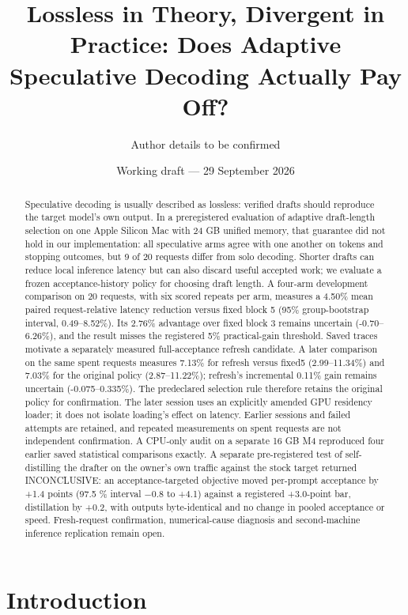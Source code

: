 \documentclass[
  11pt,
]{article}
\title{Lossless in Theory, Divergent in Practice: Does Adaptive
Speculative Decoding Actually Pay Off?}
\author{Author details to be confirmed}
\date{Working draft --- 29 September 2026}
\begin{document}
\maketitle
\begin{abstract}
Speculative decoding is usually described as lossless: verified drafts
should reproduce the target model's own output. In a preregistered
evaluation of adaptive draft-length selection on one Apple Silicon Mac
with 24 GB unified memory, that guarantee did not hold in our
implementation: all speculative arms agree with one another on tokens
and stopping outcomes, but 9 of 20 requests differ from solo decoding.
Shorter drafts can reduce local inference latency but can also discard
useful accepted work; we evaluate a frozen acceptance-history policy for
choosing draft length. A four-arm development comparison on 20 requests,
with six scored repeats per arm, measures a 4.50\% mean paired
request-relative latency reduction versus fixed block 5 (95\%
group-bootstrap interval, 0.49--8.52\%). Its 2.76\% advantage over fixed
block 3 remains uncertain (-0.70--6.26\%), and the result misses the
registered 5\% practical-gain threshold. Saved traces motivate a
separately measured full-acceptance refresh candidate. A later
comparison on the same spent requests measures 7.13\% for refresh versus
fixed5 (2.99--11.34\%) and 7.03\% for the original policy
(2.87--11.22\%); refresh's incremental 0.11\% gain remains uncertain
(-0.075--0.335\%). The predeclared selection rule therefore retains the
original policy for confirmation. The later session uses an explicitly
amended GPU residency loader; it does not isolate loading's effect on
latency. Earlier sessions and failed attempts are retained, and repeated
measurements on spent requests are not independent confirmation. A
CPU-only audit on a separate 16 GB M4 reproduced four earlier saved
statistical comparisons exactly. A separate pre-registered test of
self-distilling the drafter on the owner's own traffic against the stock
target returned INCONCLUSIVE: an acceptance-targeted objective moved
per-prompt acceptance by +1.4 points (97.5 \% interval −0.8 to +4.1)
against a registered +3.0-point bar, distillation by +0.2, with outputs
byte-identical and no change in pooled acceptance or speed.
Fresh-request confirmation, numerical-cause diagnosis and second-machine
inference replication remain open.
\end{abstract}

\section{Introduction}\label{introduction}
\end{document}
